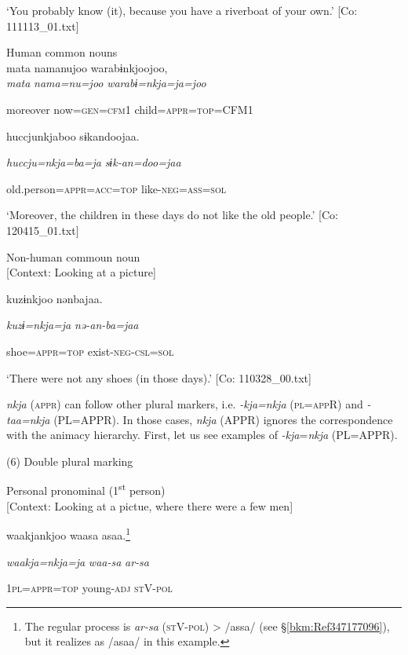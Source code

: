 \glt ‘You probably know (it), because you have a riverboat of your own.’ [Co: 111113\_01.txt]
\z

 \ex Human common nouns\\
{\TM}
\gll  mata  namanujoo  warabɨnkjoojoo,\\

      \textit{mata}  \textit{nama=nu=joo}  \textit{warabɨ=nkja=ja=joo}

      moreover  now=\textsc{gen}=\textsc{cfm}1  child=\textsc{appr}=\textsc{top}=CFM1

      huccjunkjaboo  sɨkandoojaa.

      \textit{huccju=nkja=ba=ja}  \textit{sɨk-an=doo=jaa}

      old.person=\textsc{appr}=\textsc{acc}=\textsc{top}  like-\textsc{neg}=\textsc{ass}=\textsc{sol}

\glt ‘Moreover, the children in these days do not like the old people.’ [Co: 120415\_01.txt]
\z

 \ex Non-human commoun noun\\{}
[Context: Looking at a picture]

{\TM}
\gll kuzɨnkjoo  nənbajaa.

      \textit{kuzɨ=nkja=ja}  \textit{nə-an-ba=jaa}

      shoe=\textsc{appr}=\textsc{top}  exist-\textsc{neg}-\textsc{csl}=\textsc{sol}

\glt ‘There were not any shoes (in those days).’ [Co: 110328\_00.txt]
\z

  \textit{nkja} (\textsc{appr}) can follow other plural markers, i.e. \textit{{}-kja=nkja} (\textsc{pl}=\textsc{app}R) and \textit{{}-taa=nkja} (PL=APPR). In those cases, \textit{nkja} (APPR) ignores the correspondence with the animacy hierarchy. First, let us see examples of \textit{{}-kja}=\textit{nkja} (PL=APPR).

(6)  Double plural marking

 \ea Personal pronominal (1\textsuperscript{st} person)\\{}
[Context: Looking at a pictue, where there were a few men]

{\TM}
\gll waakjankjoo  waasa  asaa.\footnote{The regular process is \textit{ar-sa} (\textsc{st}V-\textsc{pol}) > /assa/ (see §\ref{bkm:Ref347177096}), but it realizes as /asaa/ in this example.}

      \textit{waakja=nkja=ja}  \textit{waa-sa}  \textit{ar-sa}

      1\textsc{pl}=\textsc{appr}=\textsc{top}  young-\textsc{adj}  \textsc{st}V-\textsc{pol}

